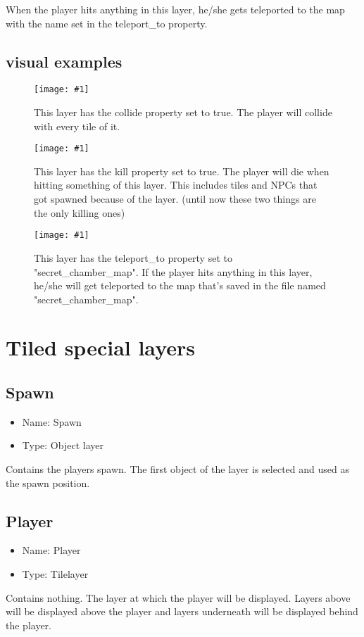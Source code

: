 \documentclass{article}
\newcommand{\erklaerbild}[2]{
	\begin{figure}[H]
		\center
		\texttt{[image: \#1]}
		\caption{#2}
	\end{figure}
}
\begin{document}
When the player hits anything in this layer, he/she gets teleported to the map with the name set in the teleport\_to property.

\subsection{visual examples}

\erklaerbild
	{custom_prop_collide.png}
	{This layer has the collide property set to true. The player will collide with every tile of it.}

\erklaerbild
	{custom_prop_kill.png}
	{This layer has the kill property set to true. The player will die when hitting something of this layer. This includes tiles and NPCs that got spawned because of the layer. (until now these two things are the only killing ones)}

\erklaerbild
	{custom_prop_teleport_to.png}
	{This layer has the teleport\_to property set to "secret\_chamber\_map". If the player hits anything in this layer, he/she will get teleported to the map that's saved in the file named "secret\_chamber\_map".}

\section{Tiled special layers}
\subsection{Spawn}
\begin{itemize}
	\item Name: Spawn
	\item Type: Object layer
\end{itemize}

Contains the players spawn. The first object of the layer is selected and used as the spawn position.

\subsection{Player}
\begin{itemize}
	\item Name: Player
	\item Type: Tilelayer
\end{itemize}

Contains nothing. The layer at which the player will be displayed. Layers above will be displayed above the player and layers underneath will be displayed behind the player.
\end{document}
